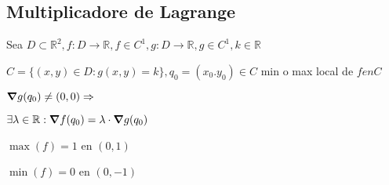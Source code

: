 \documentclass[../practica_06.tex]{subfiles}
\begin{document}
    \subsection*{Multiplicadore de Lagrange}

    Sea $D \subset \mathbb{R}^2, f:D \to \mathbb{R}, f \in C^1, g:D \to \mathbb{R}, g \in C^1, k \in \mathbb{R}$

    $ C= \{(x,y) \in D : g(x,y) = k\}, q_0=(x_0.y_0) \in C$ min o max local de $f en C$

    $ \grad g(q_0) \neq (0,0) \Rightarrow$

    $ \exists \lambda \in \mathbb{R} : \grad f(q_0) = \lambda \cdot \grad g(q_0) $

    $\max(f) = 1$ en $(0,1)$

    $\min(f) = 0$ en $(0,-1)$
\end{document}

